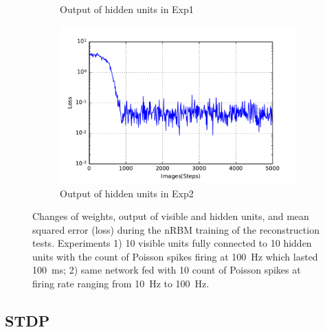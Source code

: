 \begin{figure}
\begin{subfigure}[t]{0.4\textwidth}
		\caption{Output of hidden units in Exp1}
	\end{subfigure}
	\begin{subfigure}[t]{0.4\textwidth}
		\includegraphics[width=\textwidth]{pics_sdlm/31_exp_RBM_noise/exp2_loss_s.pdf}
		\caption{Output of hidden units in Exp2}
	\end{subfigure}
	\caption{Changes of weights, output of visible and hidden units, and mean squared error (loss) during the nRBM training of the reconstruction tests. 
		Experiments 1) 10 visible units fully connected to 10 hidden units with the count of Poisson spikes firing at 100~Hz which lasted 100~ms; 2) same network fed with 10 count of Poisson spikes at firing rate ranging from 10~Hz to 100~Hz.}
	\label{fig:poisson_rbm}
\end{figure}

\subsection{STDP}

